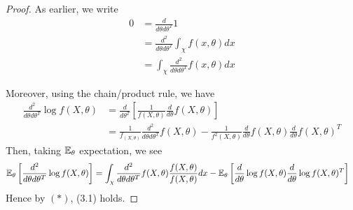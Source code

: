 \documentclass[a4paper]{article}
\begin{document}
\begin{proof}
	As earlier, we write
	\begin{align*}
		0 &= \frac{d}{d \theta d \theta^{T}} 1 \\
		&= \frac{d^2}{d \theta d \theta^{T}} \int_{\chi} f(x, \theta) dx \\
		&= \int_{\chi} \frac{d^2}{d \theta d \theta^{T}} f(x, \theta) dx \tag{*}
	\end{align*}

	Moreover, using the chain/product rule, we have
	\begin{align*}
		\frac{d^2}{d\theta d\theta^{T}}\log f(X, \theta) &= \frac{d}{d \theta^{T}} \left[ \frac{1}{f(X, \theta)} \frac{d}{d\theta} f(X,\theta) \right] \\
		&= \frac{1}{f_(X,\theta)} \frac{d^2}{d\theta d\theta^{T}} f(X, \theta) - \frac{1}{f^2(X, \theta)} \frac{d}{d \theta} f(X, \theta) \frac{d}{d \theta} f(X, \theta)^{T}
	\end{align*}
	Then, taking $\mathbb{E}_{\theta}$ expectation, we see
	 \begin{align*}
		 \mathbb{E}_{\theta} \left[ \frac{d^2}{d\theta d\theta^{T}} \log f(X, \theta)\right] &= \int_{\chi} \frac{d^2}{d\theta d\theta^{T}} f(X,\theta) \frac{f(X, \theta)}{f(X,\theta)} dx - \mathbb{E}_{\theta} \left[ \frac{d}{d \theta} \log f(X, \theta) \frac{d}{d \theta} \log f(X, \theta)^{T}  \right] 
	\end{align*}
	Hence by $(*)$, (3.1) holds.
\end{proof}
\end{document}
